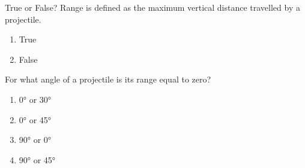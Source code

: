 \documentclass[main-physics.tex]{subfiles}
\begin{document}












\begin{exercise} \label{xj6gln}
    True or False? Range is defined as the maximum vertical distance travelled by a projectile. 
\end{exercise}

\begin{enumerate}[label=\Alph*.]
    \item True
    \item False
\end{enumerate}

\begin{exercise} \label{5wfdN0}
    For what angle of a projectile is its range equal to zero?
\end{exercise}

\begin{enumerate}[label=\Alph*.]
    \item \ang{0} or \ang{30}
    \item \ang{0} or \ang{45}
    \item \ang{90} or \ang{0}
    \item \ang{90} or \ang{45}
\end{enumerate}
\end{document}
